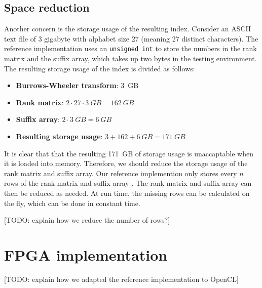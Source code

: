 \subsection{Space reduction} \label{section:space_reduction}

Another concern is the storage usage of the resulting index.
Consider an ASCII text file of 3 gigabyte with alphabet size 27 (meaning 27 distinct characters).
The reference implementation uses an \texttt{unsigned int} to store the numbers in the rank matrix and the suffix array, which takes up two bytes in the testing environment.
The resulting storage usage of the index is divided as follows:

\begin{itemize}
  \item \textbf{Burrows-Wheeler transform}: \SI{3}{GB}
  \item \textbf{Rank matrix}: $2 \cdot 27 \cdot \SI{3}{GB} = \SI{162}{GB}$
  \item \textbf{Suffix array}: $2 \cdot \SI{3}{GB} = \SI{6}{GB}$
  \item \textbf{Resulting storage usage}: $3 + 162 + \SI{6}{GB} = \SI{171}{GB}$
\end{itemize}

It is clear that that the resulting \SI{171}{GB} of storage usage is unaccaptable when it is loaded into memory.
Therefore, we should reduce the storage usage of the rank matrix and suffix array.
Our reference implemention only stores every $n$ rows of the rank matrix and suffix array \cite{fernandez_string_2011,langmead_introduction_nodate}.
The rank matrix and suffix array can then be reduced as needed.
At run time, the missing rows can be calculated on the fly, which can be done in constant time.

[TODO: explain how we reduce the number of rows?]



\section{FPGA implementation} \label{section:fpga_impl}

[TODO: explain how we adapted the reference implementation to OpenCL]
